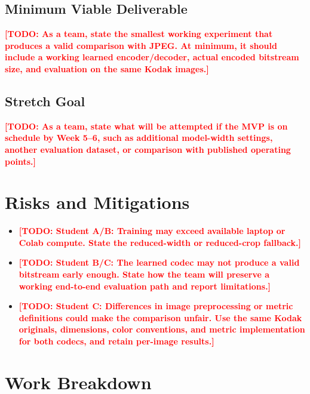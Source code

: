 \documentclass[11pt]{article}
\newcommand{\todo}[1]{\textcolor{red}{\textbf{[TODO: #1]}}}
\begin{document}
\subsection{Minimum Viable Deliverable}
\todo{As a team, state the smallest working experiment that produces
a valid comparison with JPEG. At minimum, it should include a working
learned encoder/decoder, actual encoded bitstream size, and evaluation
on the same Kodak images.}

\subsection{Stretch Goal}
\todo{As a team, state what will be attempted if the MVP is on schedule
by Week 5--6, such as additional model-width settings, another
evaluation dataset, or comparison with published operating points.}

\section{Risks and Mitigations}
\begin{itemize}[leftmargin=*]
    \item \todo{Student A/B: Training may exceed available laptop or
    Colab compute. State the reduced-width or reduced-crop fallback.}
    \item \todo{Student B/C: The learned codec may not produce a valid
    bitstream early enough. State how the team will preserve a working
    end-to-end evaluation path and report limitations.}
    \item \todo{Student C: Differences in image preprocessing or metric
    definitions could make the comparison unfair. Use the same Kodak
    originals, dimensions, color conventions, and metric implementation
    for both codecs, and retain per-image results.}
\end{itemize}

\section{Work Breakdown}
\end{document}
